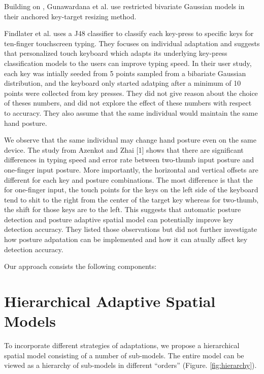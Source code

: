 \documentclass{sigchi}
\begin{document}
Building on \cite{Goodman:2002}, Gunawardana et al. use restricted bivariate Gaussian
models in their anchored key-target resizing method.

Findlater et al. \cite{Findlater:2012} uses a J48 classifier to classify
each key-press to specific keys for ten-finger touchscreen typing. They
focuses on individual adaptation and suggests that personalized touch keyboard
which adapts its underlying key-press classification models to the users can improve typing speed.  
In their user study, each key was intially seeded from 5 points sampled from
a bibariate Gaussian distribution, and the keyboard only started adatping
after a minimum of 10 points were collected from key presses. They did not
give reason about the choice of theses numbers, and did not explore the
effect of these numbers with respect to accuracy. They also assume that the same
individual would maintain the same hand posture.

We observe that the same individual may change hand posture even on the same device. 
The study from Azenkot and Zhai [1] shows that there are significant differences 
in typing speed and error rate between two-thumb input posture and one-finger 
input posture. More importantly, the horizontal and vertical offsets are 
different for each key and posture combinations. The most difference is that the for
one-finger input, the touch points for the keys on the left side of the keyboard tend to
shit to the right from the center of the target key whereas for two-thumb, the shift for those
keys are to the left. This suggests that automatic posture detection and posture
adaptive spatial model can potentially improve key detection accuracy. They listed those observations but
did not further investigate how posture adpatation can be implemented and how it can atually
affect key detection accuracy.

Our approach consists the following components:

\section{Hierarchical Adaptive Spatial Models}

To incorporate different strategies of adaptations, we propose a hierarchical
spatial model consisting of a number of sub-models.
The entire model can be viewed as a hierarchy of sub-models in different
“orders” (Figure. \ref{fig:hierarchy}).
\end{document}
